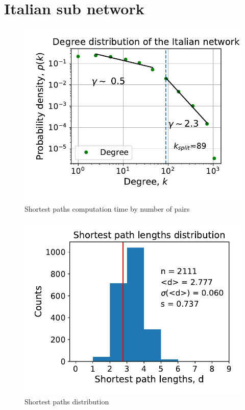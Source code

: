 \documentclass[12pt, twoside]{report}
\begin{document}
\section{Italian sub network}
\begin{minipage}[b]{0.5\textwidth}
   \centering
    \begin{figure}[H]
      \includegraphics[width=\textwidth]{../../scripts/network_analysis/imgs/tot_degree_distribution_ita.pdf}            
          \caption{Shortest paths computation time by number of pairs}
      \label{fig:path_time}
\end{figure}
\end{minipage}
\begin{minipage}[b]{0.5\textwidth}
  \begin{figure}[H]
  \centering
      \includegraphics[width=\textwidth]{../../scripts/network_analysis/imgs/paths_hist_ita.pdf}            
        \caption{Shortest paths distribution}
\end{figure}
\end{minipage}
\end{document}
